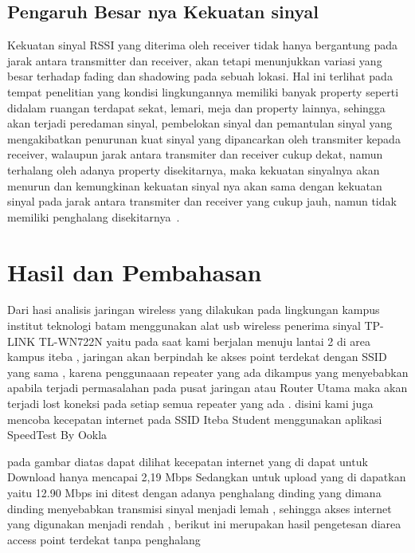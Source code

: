 \documentclass[conference]{IEEEtran}
\begin{document}
\subsection{Pengaruh Besar nya Kekuatan sinyal}
Kekuatan sinyal RSSI yang diterima oleh
receiver tidak hanya bergantung pada jarak
antara transmitter dan receiver, akan tetapi
menunjukkan variasi yang besar terhadap fading
dan shadowing pada sebuah lokasi. Hal ini
terlihat pada tempat penelitian yang kondisi
lingkungannya memiliki banyak property seperti
didalam ruangan terdapat sekat, lemari, meja dan
property lainnya, sehingga akan terjadi peredaman sinyal, pembelokan sinyal dan pemantulan
sinyal yang mengakibatkan penurunan kuat
sinyal yang dipancarkan oleh transmiter kepada
receiver, walaupun jarak antara transmiter dan
receiver cukup dekat, namun terhalang oleh
adanya property disekitarnya, maka kekuatan
sinyalnya akan menurun dan kemungkinan
kekuatan sinyal nya akan sama dengan kekuatan
sinyal pada jarak antara transmiter dan receiver
yang cukup jauh, namun tidak memiliki
penghalang disekitarnya~. \cite{puspitasari2014analisis}




\section{Hasil dan Pembahasan}

Dari hasi analisis jaringan wireless yang dilakukan pada lingkungan kampus
institut teknologi batam menggunakan alat usb wireless penerima sinyal TP-LINK TL-WN722N yaitu pada saat kami berjalan menuju lantai 2 di area kampus iteba , jaringan akan berpindah
ke akses point terdekat dengan SSID yang sama , karena penggunaaan repeater yang ada dikampus yang menyebabkan apabila terjadi permasalahan
pada pusat jaringan atau Router Utama maka akan terjadi lost koneksi pada setiap semua repeater yang ada .
disini kami juga mencoba kecepatan internet pada SSID Iteba Student menggunakan aplikasi SpeedTest By Ookla



pada gambar diatas dapat dilihat kecepatan internet yang di dapat untuk Download hanya mencapai 2,19 Mbps Sedangkan untuk upload  yang
di dapatkan yaitu 12.90 Mbps ini ditest dengan adanya penghalang dinding yang dimana dinding menyebabkan transmisi sinyal menjadi lemah , 
sehingga akses internet yang digunakan menjadi rendah , berikut ini merupakan hasil pengetesan diarea access point terdekat tanpa penghalang
\end{document}
